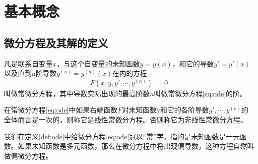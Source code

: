 \section{基本概念}
\subsection{微分方程及其解的定义}
\begin{defn}[常微分方程]\label{def:ode}
凡是联系自变量$x$，与这个自变量的未知函数$y=y(x)$，和它的导数$y'=y'(x)$以及直到n阶导数$y^{(n)}=y^{(n)}(x)$在内的方程
\begin{equation}\label{eq:ode}
F(x,y,y',\cdots,y^{(n)})\,=\,0
\end{equation}
叫做{\heiti 常微分方程}，其中导数实际出现的最高阶数$n$叫做常微分方程\eqref{eq:ode}的{\heiti 阶}。
\end{defn}

在常微分方程\eqref{eq:ode}中如果右端函数$F$对未知函数y和它的各阶导数$y',\cdots,y^{(n)}$的全体而言是一次的，则称它是{\heiti 线性}常微分方程。否则称它为{\heiti 非线性}常微分方程。\par
我们在定义\ref{def:ode}中给微分方程\eqref{eq:ode}冠以“常”字，指的是未知函数是一元函数。如果未知函数是多元函数，那么在微分方程中将出现偏导数，这种方程自然叫做{\heiti 偏微分方程}。

